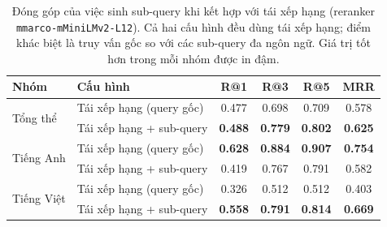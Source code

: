 
\begin{table}[htbp]
\centering
\caption{Đóng góp của việc sinh sub-query khi kết hợp với tái xếp hạng
(reranker \texttt{mmarco-mMiniLMv2-L12}). Cả hai cấu hình đều dùng tái xếp hạng;
điểm khác biệt là truy vấn gốc so với các sub-query đa ngôn ngữ. Giá trị tốt hơn
trong mỗi nhóm được in đậm.}
\label{tab:subquery-rerank}
\begin{tabular}{llcccc}
\toprule
Nhóm & Cấu hình & R@1 & R@3 & R@5 & MRR \\
\midrule
\multirow{2}{*}{Tổng thể}
 & Tái xếp hạng (query gốc)  & 0.477 & 0.698 & 0.709 & 0.578 \\
 & Tái xếp hạng + sub-query  & \textbf{0.488} & \textbf{0.779} & \textbf{0.802} & \textbf{0.625} \\
\midrule
\multirow{2}{*}{Tiếng Anh}
 & Tái xếp hạng (query gốc)  & \textbf{0.628} & \textbf{0.884} & \textbf{0.907} & \textbf{0.754} \\
 & Tái xếp hạng + sub-query  & 0.419 & 0.767 & 0.791 & 0.582 \\
\midrule
\multirow{2}{*}{Tiếng Việt}
 & Tái xếp hạng (query gốc)  & 0.326 & 0.512 & 0.512 & 0.403 \\
 & Tái xếp hạng + sub-query  & \textbf{0.558} & \textbf{0.791} & \textbf{0.814} & \textbf{0.669} \\
\bottomrule
\end{tabular}
\end{table}

